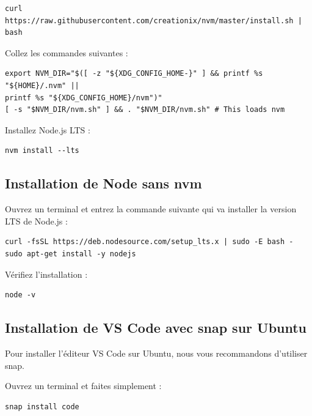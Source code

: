 \documentclass{article}
\begin{document}
\begin{verbatim}
curl https://raw.githubusercontent.com/creationix/nvm/master/install.sh | bash
\end{verbatim}

Collez les commandes suivantes :

\begin{verbatim}
export NVM_DIR="$([ -z "${XDG_CONFIG_HOME-}" ] && printf %s "${HOME}/.nvm" || 
printf %s "${XDG_CONFIG_HOME}/nvm")"
[ -s "$NVM_DIR/nvm.sh" ] && . "$NVM_DIR/nvm.sh" # This loads nvm
\end{verbatim}

Installez Node.js LTS :

\begin{verbatim}
nvm install --lts
\end{verbatim}

\subsection{Installation de Node sans nvm}
Ouvrez un terminal et entrez la commande suivante qui va installer la version LTS de Node.js :
\begin{verbatim}
curl -fsSL https://deb.nodesource.com/setup_lts.x | sudo -E bash -
sudo apt-get install -y nodejs
\end{verbatim}

Vérifiez l'installation :
\begin{verbatim}
node -v
\end{verbatim}

\subsection{Installation de VS Code avec snap sur Ubuntu}
Pour installer l'éditeur VS Code sur Ubuntu, nous vous recommandons d'utiliser snap.

Ouvrez un terminal et faites simplement :
\begin{verbatim}
snap install code
\end{verbatim}
\end{document}
